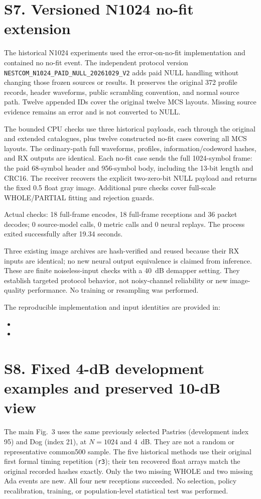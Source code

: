 \documentclass[11pt,letterpaper]{article}
\begin{document}
\clearpage\section*{S7. Versioned N1024 no-fit extension}
The historical N1024 experiments used the error-on-no-fit implementation and contained no no-fit event. The independent protocol version \texttt{NESTCOM\_N1024\_PAID\_NULL\_20261029\_V2} adds paid NULL handling without changing those frozen sources or results. It preserves the original 372 profile records, header waveforms, public scrambling convention, and normal source path. Twelve appended IDs cover the original twelve MCS layouts. Missing source evidence remains an error and is not converted to NULL.

The bounded CPU checks use three historical payloads, each through the original and extended catalogues, plus twelve constructed no-fit cases covering all MCS layouts. The ordinary-path full waveforms, profiles, information/codeword hashes, and RX outputs are identical. Each no-fit case sends the full 1024-symbol frame: the paid 68-symbol header and 956-symbol body, including the 13-bit length and CRC16. The receiver recovers the explicit two-zero-bit NULL payload and returns the fixed 0.5 float gray image. Additional pure checks cover full-scale WHOLE/PARTIAL fitting and rejection guards.

Actual checks: 18 full-frame encodes, 18 full-frame receptions and 36 packet decodes; 0 source-model calls, 0 metric calls and 0 neural replays. The process exited successfully after 19.34 seconds.

Three existing image archives are hash-verified and reused because their RX inputs are identical; no new neural output equivalence is claimed from inference. These are finite noiseless-input checks with a 40~dB demapper setting. They establish targeted protocol behavior, not noisy-channel reliability or new image-quality performance. No training or resampling was performed.

The reproducible implementation and input identities are provided in:
\begin{itemize}
\item {}
\item {}
\end{itemize}

\clearpage\section*{S8. Fixed 4-dB development examples and preserved 10-dB view}
The main Fig.~3 uses the same previously selected Pastries (development index 95) and Dog (index 21), at $N=1024$ and 4~dB. They are not a random or representative common500 sample. The five historical methods use their original first formal timing repetition (\texttt{r3}); their ten recovered float arrays match the original recorded hashes exactly. Only the two missing WHOLE and two missing Ada events are new. All four new receptions succeeded. No selection, policy recalibration, training, or population-level statistical test was performed.
\end{document}
